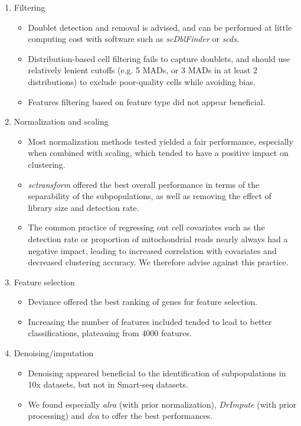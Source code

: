 \documentclass{bmcart}
\begin{document}
\begin{enumerate}
   \item Filtering
   \begin{itemize}
     \item Doublet detection and removal is advised, and can be performed at little computing cost with software such as \textit{scDblFinder} or \textit{scds}.
     \item Distribution-based cell filtering fails to capture doublets, and should use relatively lenient cutoffs (e.g. 5 MADs, or 3 MADs in at least 2 distributions) to exclude poor-quality cells while avoiding bias.
     \item Features filtering based on feature type did not appear beneficial.
   \end{itemize}
   \item Normalization and scaling
   \begin{itemize}
     \item Most normalization methods tested yielded a fair performance, especially when combined with scaling, which tended to have a positive impact on clustering.
     \item \textit{sctransform} offered the best overall performance in terms of the separability of the subpopulations, as well as removing the effect of library size and detection rate.
     \item The common practice of regressing out cell covariates such as the detection rate or proportion of mitochondrial reads nearly always had a negative impact, leading to increased correlation with covariates and decreased clustering accuracy. We therefore advise against this practice.
   \end{itemize}
   \item Feature selection
   \begin{itemize}
     \item Deviance \citep{townesGlmpca2019} offered the best ranking of genes for feature selection.
     \item Increasing the number of features included tended to lead to better classifications, plateauing from 4000 features.
   \end{itemize}
   \item Denoising/imputation
   \begin{itemize}
       \item Denoising appeared beneficial to the identification of subpopulations in 10x datasets, but not in Smart-seq datasets.
       \item We found especially \textit{alra} (with prior normalization), \textit{DrImpute} (with prior processing) and \textit{dca} to offer the best performances.

\end{itemize}
\end{enumerate}
\end{document}
